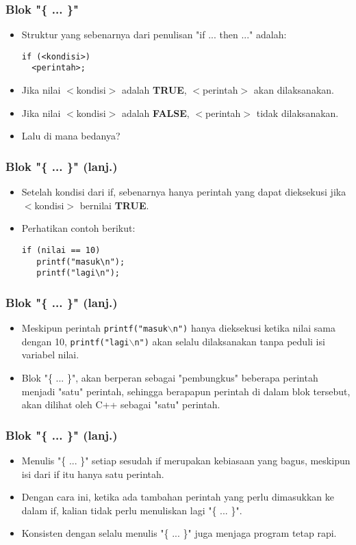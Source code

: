 \begin{frame}[fragile]
\frametitle{Blok "\{ ... \}"}
\begin{itemize}
  \item Struktur yang sebenarnya dari penulisan "if ... then ..." adalah:
\begin{lstlisting}
if (<kondisi>)
  <perintah>;
\end{lstlisting}
  \item Jika nilai $<$kondisi$>$ adalah \textbf{TRUE}, $<$perintah$>$ akan dilaksanakan.
  \item Jika nilai $<$kondisi$>$ adalah \textbf{FALSE}, $<$perintah$>$ tidak dilaksanakan.
  \item Lalu di mana bedanya?
\end{itemize}
\end{frame}

\begin{frame}[fragile]
\frametitle{Blok "\{ ... \}" (lanj.)}
\begin{itemize}
  \item Setelah kondisi dari if, sebenarnya hanya  perintah yang dapat dieksekusi jika $<$kondisi$>$ bernilai \textbf{TRUE}.
  \item Perhatikan contoh berikut:
\begin{lstlisting}
if (nilai == 10)
   printf("masuk\n");
   printf("lagi\n");
\end{lstlisting}
\end{itemize}
\end{frame}

\begin{frame}[fragile]
\frametitle{Blok "\{ ... \}" (lanj.)}
\begin{itemize}
  \item Meskipun perintah \texttt{printf("masuk$\backslash$n")} hanya dieksekusi ketika nilai sama dengan 10, \texttt{printf("lagi$\backslash$n")} akan selalu dilaksanakan tanpa peduli isi variabel nilai.
  \item Blok "\{ ... \}", akan berperan sebagai "pembungkus" beberapa perintah menjadi "satu" perintah, sehingga berapapun perintah di dalam blok tersebut, akan dilihat oleh C++ sebagai "satu" perintah.
\end{itemize}
\end{frame}

\begin{frame}[fragile]
\frametitle{Blok "\{ ... \}" (lanj.)}
\begin{itemize}
  \item Menulis "\{ ... \}" setiap sesudah if merupakan kebiasaan yang bagus, meskipun isi dari if itu hanya satu perintah.
  \item Dengan cara ini, ketika ada tambahan perintah yang perlu dimasukkan ke dalam if, kalian tidak perlu menuliskan lagi "\{ ... \}".
  \item Konsisten dengan selalu menulis "\{ ... \}" juga menjaga program tetap rapi.
\end{itemize}
\end{frame}

